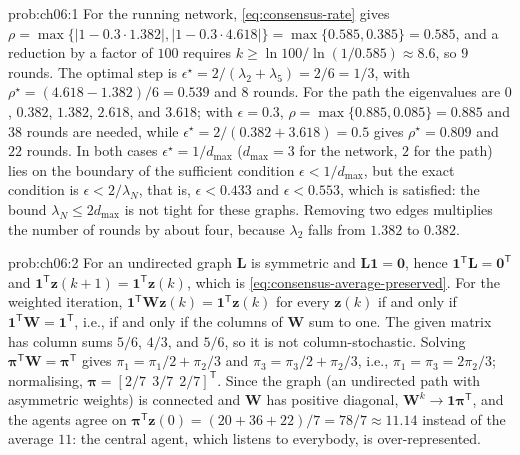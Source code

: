 \begin{sol}{prob:ch06:1}
For the running network, \eqref{eq:consensus-rate} gives $\rho=\max\{|1-0.3\cdot1.382|,|1-0.3\cdot4.618|\}=\max\{0.585,0.385\}=0.585$, and a reduction by a factor of $100$ requires $k\ge\ln 100/\ln(1/0.585)\approx8.6$, so $9$ rounds. The optimal step is $\epsilon^{\star}=2/(\lambda_2+\lambda_5)=2/6=1/3$, with $\rho^{\star}=(4.618-1.382)/6=0.539$ and $8$ rounds. For the path the eigenvalues are $0$, $0.382$, $1.382$, $2.618$, and $3.618$; with $\epsilon=0.3$, $\rho=\max\{0.885,0.085\}=0.885$ and $38$ rounds are needed, while $\epsilon^{\star}=2/(0.382+3.618)=0.5$ gives $\rho^{\star}=0.809$ and $22$ rounds. In both cases $\epsilon^{\star}=1/d_{\max}$ ($d_{\max}=3$ for the network, $2$ for the path) lies on the boundary of the sufficient condition $\epsilon<1/d_{\max}$, but the exact condition is $\epsilon<2/\lambda_N$, that is, $\epsilon<0.433$ and $\epsilon<0.553$, which is satisfied: the bound $\lambda_N\le2d_{\max}$ is not tight for these graphs. Removing two edges multiplies the number of rounds by about four, because $\lambda_2$ falls from $1.382$ to $0.382$.
\end{sol}

\begin{sol}{prob:ch06:2}
For an undirected graph $\mathbf{L}$ is symmetric and $\mathbf{L}\mathbf{1}=\mathbf{0}$, hence $\mathbf{1}^{\mathsf T}\mathbf{L}=\mathbf{0}^{\mathsf T}$ and $\mathbf{1}^{\mathsf T}\mathbf{z}(k+1)=\mathbf{1}^{\mathsf T}\mathbf{z}(k)$, which is \eqref{eq:consensus-average-preserved}. For the weighted iteration, $\mathbf{1}^{\mathsf T}\mathbf{W}\mathbf{z}(k)=\mathbf{1}^{\mathsf T}\mathbf{z}(k)$ for every $\mathbf{z}(k)$ if and only if $\mathbf{1}^{\mathsf T}\mathbf{W}=\mathbf{1}^{\mathsf T}$, i.e., if and only if the columns of $\mathbf{W}$ sum to one. The given matrix has column sums $5/6$, $4/3$, and $5/6$, so it is not column-stochastic. Solving $\boldsymbol{\pi}^{\mathsf T}\mathbf{W}=\boldsymbol{\pi}^{\mathsf T}$ gives $\pi_1=\pi_1/2+\pi_2/3$ and $\pi_3=\pi_3/2+\pi_2/3$, i.e., $\pi_1=\pi_3=2\pi_2/3$; normalising, $\boldsymbol{\pi}=[2/7\ \ 3/7\ \ 2/7]^{\mathsf T}$. Since the graph (an undirected path with asymmetric weights) is connected and $\mathbf{W}$ has positive diagonal, $\mathbf{W}^{k}\to\mathbf{1}\boldsymbol{\pi}^{\mathsf T}$, and the agents agree on $\boldsymbol{\pi}^{\mathsf T}\mathbf{z}(0)=(20+36+22)/7=78/7\approx11.14$ instead of the average $11$: the central agent, which listens to everybody, is over-represented.
\end{sol}

